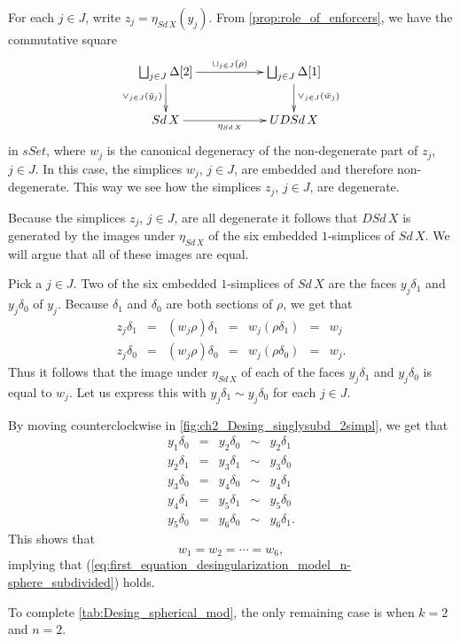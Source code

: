 \begin{example}
For each $j\in J$, write $z_j=\eta _{Sd\, X}(y_j)$. From \cref{prop:role_of_enforcers}, we have the commutative square
\begin{equation}
\label{eq:second_diagram_ex_desingularization_model_n-sphere_subdivided}
\begin{gathered}
\xymatrix{
\bigsqcup _{j\in J}\Delta [2] \ar[d]_{\vee _{j\in J}(\bar{y} _j)} \ar[rr]^{\sqcup _{j\in J}(\rho )} && \bigsqcup _{j\in J}\Delta [1] \ar[d]^{\vee _{j\in J}(\bar{w} _j)} \\
Sd\, X \ar[rr]_{\eta _{Sd\, X}} && UDSd\, X
}
\end{gathered}
\end{equation}
in $sSet$, where $w_j$ is the canonical degeneracy of the non-degenerate part of $z_j$, $j\in J$.  In this case, the simplices $w_j$, $j\in J$, are embedded and therefore non-degenerate. This way we see how the simplices $z_j$, $j\in J$, are degenerate.

Because the simplices $z_j$, $j\in J$, are all degenerate it follows that $DSd\, X$ is generated by the images under $\eta _{Sd\, X}$ of the six embedded $1$-simplices of $Sd\, X$. We will argue that all of these images are equal.

Pick a $j\in J$. Two of the six embedded $1$-simplices of $Sd\, X$ are the faces $y_j\delta _1$ and $y_j\delta _0$ of $y_j$. Because $\delta _1$ and $\delta _0$ are both sections of $\rho$, we get that
\begin{displaymath}
\begin{array}{rclclcl}
z_j\delta _1 & = & (w_j\rho )\delta _1 & = & w_j(\rho \delta _1) & = & w_j \\
z_j\delta _0 & = & (w_j\rho )\delta _0 & = & w_j(\rho \delta _0) & = & w_j.
\end{array}
\end{displaymath}
Thus it follows that the image under $\eta _{Sd\, X}$ of each of the faces $y_j\delta _1$ and $y_j\delta _0$ is equal to $w_j$. Let us express this with $y_j\delta _1\sim y_j\delta _0$ for each $j\in J$.

By moving counterclockwise in \cref{fig:ch2_Desing_singlysubd_2simpl}, we get that
\begin{displaymath}
\begin{array}{rclcl}
y_1\delta _0 & = & y_2\delta _0 & \sim & y_2\delta _1 \\
y_2\delta _1 & = & y_3\delta _1 & \sim & y_3\delta _0 \\
y_3\delta _0 & = & y_4\delta _0 & \sim & y_4\delta _1 \\
y_4\delta _1 & = & y_5\delta _1 & \sim & y_5\delta _0 \\
y_5\delta _0 & = & y_6\delta _0 & \sim & y_6\delta _1.
\end{array}
\end{displaymath}
This shows that
\[w_1=w_2=\cdots =w_6,\]
implying that (\ref{eq:first_equation_desingularization_model_n-sphere_subdivided}) holds.
\end{example}
\noindent To complete \cref{tab:Desing_spherical_mod}, the only remaining case is when $k=2$ and $n=2$.

